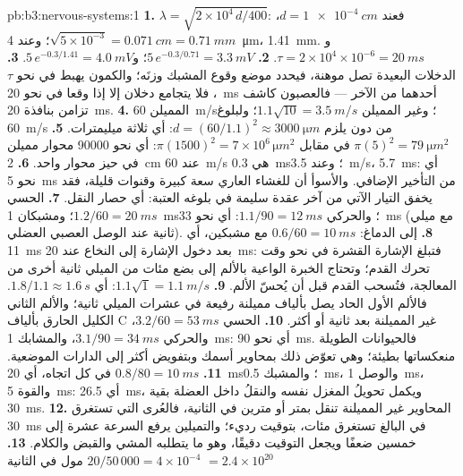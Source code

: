 \begin{solution}{pb:b3:nervous-systems:1}
\textbf{1.} $\lambda = \sqrt{2\times 10^{4}\,d/400}$: فعند $d =
\qty{1e-4}{cm}$، $\sqrt{5\times 10^{-3}} = \qty{0.071}{cm} =
\qty{0.71}{mm}$؛ وعند \qty{4}{\micro m}، \qty{1.41}{mm}. و$\tau = 2\times
10^{4}\times 10^{-6} = \qty{20}{ms}$.
\textbf{2.} $5\,e^{-0.3/0.71} = \qty{3.3}{mV}$؛ و$5\,e^{-0.3/1.41} =
\qty{4.0}{mV}$.
\textbf{3.} الدخلات البعيدة تصل موهنة، فيحدد موضع وقوع المشبك
وزنَه؛ والكمون يهبط في نحو $\tau$، فلا يتجامع دخلان إلا إذا
وقعا في نحو \qty{20}{ms} أحدهما من الآخر --- فالعصبون كاشف
تزامن بنافذة \qty{20}{ms}.
\textbf{4.} المميلن \qty{60}{m/s}؛ وغير المميلن $1.1\sqrt{10} =
\qty{3.5}{m/s}$؛ ولبلوغ \qty{60}{m/s} من دون  يلزم $d = (60/1.1)^{2}
\approx \qty{3000}{\micro m}$: أي ثلاثة ميليمترات.
\textbf{5.} $\pi(5)^{2} = \qty{79}{\micro m^2}$ في مقابل $\pi(1500)^{2} =
7\times 10^{6}\,\unit{\micro m^2}$: أي نحو \num{90000} محوار مميلن
في حيز محوار واحد.
\textbf{6.} \qty{2}{cm} عند \qty{60}{m/s} هي \qty{0.3}{ms}؛ وعند
\qty{3.5}{m/s}، \qty{5.7}{ms}: أي نحو \qty{5}{ms} من التأخير
الإضافي. والأسوأ أن للغشاء العاري سعة كبيرة وقنوات قليلة،
فقد يخفق التيار الآتي من آخر عقدة سليمة في بلوغه العتبة:
أي حصار النقل.
\textbf{7.} الحسي $1.2/60 = \qty{20}{ms}$؛ ومشبكان \qty{1}{ms}؛
والحركي $1.1/90 = \qty{12}{ms}$: أي نحو \qty{33}{ms} (مع ميلي
ثانية عند الوصل العصبي العضلي).
\textbf{8.} إلى الدماغ: $0.6/60 = \qty{10}{ms}$ مع مشبكين، أي
\qty{11}{ms} بعد دخول الإشارة إلى النخاع عند \qty{20}{ms}:
فتبلغ الإشارة القشرة في نحو وقت تحرك القدم؛ وتحتاج الخبرة
الواعية بالألم إلى بضع مئات من الميلي ثانية أخرى من
المعالجة، فتُسحب القدم قبل أن يُحسّ الألم.
\textbf{9.} $1.1\sqrt{1} = \qty{1.1}{m/s}$: أي $1.8/1.1 \approx
\qty{1.6}{s}$. فالألم الأول الحاد يصل بألياف مميلنة رفيعة في
عشرات الميلي ثانية؛ والألم الثاني الكليل الحارق بألياف C
غير المميلنة بعد ثانية أو أكثر.
\textbf{10.} الحسي $3.2/60 = \qty{53}{ms}$، والحركي $3.1/90 =
\qty{34}{ms}$، والمشابك \qty{1}{ms}: أي نحو \qty{90}{ms}.
فالحيوانات الطويلة منعكساتها بطيئة؛ وهي تعوّض ذلك بمحاوير
أسمك وبتفويض أكثر إلى الدارات الموضعية.
\textbf{11.} $0.8/80 = \qty{10}{ms}$ في كل اتجاه، أي \qty{20}{ms}؛
والمشبك \qty{0.5}{ms}، والوصل \qty{1}{ms}، والقوة \qty{5}{ms}:
أي \qty{26.5}{ms}، ويكمل تحويلُ المغزل نفسه والنقلُ داخل
العضلة بقية \qty{30}{ms}.
\textbf{12.} المحاوير غير المميلنة تنقل بمتر أو مترين في
الثانية، فالعُرى التي تستغرق \qty{30}{ms} في البالغ تستغرق
مئات، بتوقيت رديء؛ والتميلين يرفع السرعة عشرة إلى خمسين
ضعفًا ويجعل التوقيت دقيقًا، وهو ما يتطلبه المشي والقبض
والكلام.
\textbf{13.} $20/50\,000 = 4\times 10^{-4}$ مول في الثانية $= 2.4\times 10^{20}$

\end{solution}
